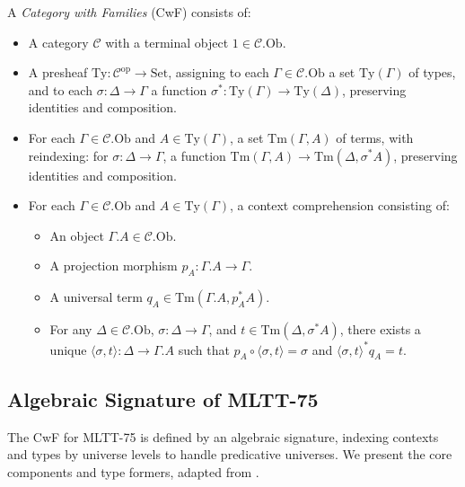 \documentclass{article}
\begin{document}
\newpage
\begin{definition}
A \emph{Category with Families} (CwF) consists of:
\begin{itemize}
  \item A category $\mathcal{C}$ with a terminal object $1 \in \mathcal{C}.\text{Ob}$.
  \item A presheaf $\text{Ty} : \mathcal{C}^{\text{op}} \to \text{Set}$, assigning to each $\Gamma \in \mathcal{C}.\text{Ob}$ a set $\text{Ty}(\Gamma)$ of types, and to each $\sigma : \Delta \to \Gamma$ a function $\sigma^* : \text{Ty}(\Gamma) \to \text{Ty}(\Delta)$, preserving identities and composition.
  \item For each $\Gamma \in \mathcal{C}.\text{Ob}$ and $A \in \text{Ty}(\Gamma)$, a set $\text{Tm}(\Gamma, A)$ of terms, with reindexing: for $\sigma : \Delta \to \Gamma$, a function $\text{Tm}(\Gamma, A) \to \text{Tm}(\Delta, \sigma^* A)$, preserving identities and composition.
  \item For each $\Gamma \in \mathcal{C}.\text{Ob}$ and $A \in \text{Ty}(\Gamma)$, a context comprehension consisting of:
    \begin{itemize}
      \item An object $\Gamma.A \in \mathcal{C}.\text{Ob}$.
      \item A projection morphism $p_A : \Gamma.A \to \Gamma$.
      \item A universal term $q_A \in \text{Tm}(\Gamma.A, p_A^* A)$.
      \item For any $\Delta \in \mathcal{C}.\text{Ob}$, $\sigma : \Delta \to \Gamma$, and $t \in \text{Tm}(\Delta, \sigma^* A)$, there exists a unique $\langle \sigma, t \rangle : \Delta \to \Gamma.A$ such that $p_A \circ \langle \sigma, t \rangle = \sigma$ and $\langle \sigma, t \rangle^* q_A = t$.
    \end{itemize}
\end{itemize}
\end{definition}

\newpage
\subsection{Algebraic Signature of MLTT-75}
The CwF for MLTT-75 is defined by an algebraic signature, indexing contexts and types by universe levels to handle predicative universes. We present the core components and type formers, adapted from \cite{Kaposi2019}.
\end{document}
